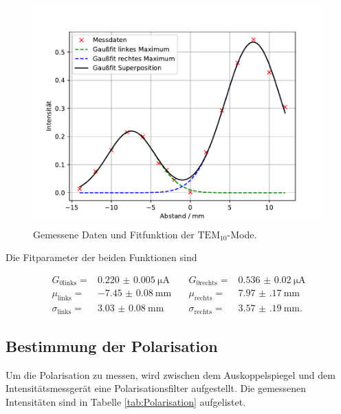 \FloatBarrier
\begin{figure}
  \centering
  \includegraphics[width = \textwidth, keepaspectratio]{figure/TEM01.pdf}
  \caption{Gemessene Daten und Fitfunktion der $\text{TEM}_{10}$-Mode.}
\end{figure}
\FloatBarrier

Die Fitparameter der beiden Funktionen sind 

\begin{align*}
G_{0 \text{links}}=&\SI{0.220(5)}{\micro\ampere}\quad &G_{0 \text{rechts}}=&\SI{0.536(20)}{\micro\ampere}\\
\mu_{\text{links}} =& \SI{-7.45(8)}{\milli\meter}\quad &\mu_{\text{rechts}} =& \SI{7.97(17)}{\milli\meter}\\
\sigma_{\text{links}} =& \SI{3.03(8)}{\milli\meter}\quad &\sigma_{\text{rechts}} =& \SI{3.57(19)}{\milli\meter}.
\end{align*}

\subsection{Bestimmung der Polarisation}

Um die Polarisation zu messen, wird zwischen dem Auskoppelspiegel und dem Intensitätsmessgerät eine Polarisationsfilter 
aufgestellt. Die gemessenen Intensitäten sind in Tabelle \ref{tab:Polarisation} aufgelistet.

